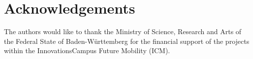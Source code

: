 \documentclass[5p,times,procedia]{elsarticle}
\begin{document}
\section*{Acknowledgements}
The authors would like to thank the Ministry of Science, Research and Arts of the Federal State of Baden-Württemberg for the financial support of the projects within the InnovationsCampus Future Mobility (ICM).













	
	
	
	
	
	
\end{document}
